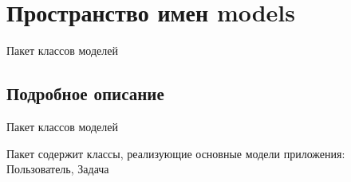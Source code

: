 \hypertarget{namespacemodels}{}\section{Пространство имен models}
\label{namespacemodels}


Пакет классов моделей  




\subsection{Подробное описание}
Пакет классов моделей 

Пакет содержит классы, реализующие основные модели приложения\+: Пользователь, Задача 